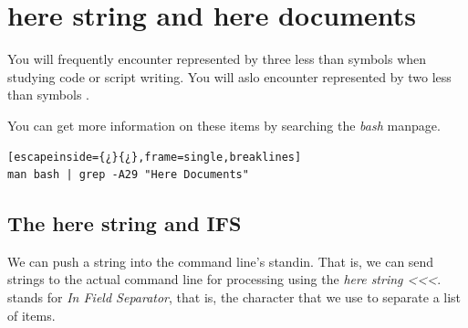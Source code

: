 \section{here string and here documents}

You will frequently encounter  represented by three less than symbols \tbi{<{}<{}<{}} when studying code or script writing. You will aslo encounter  represented by two less than symbols \tbi{<{}<{}}.

You can get more information on these items by searching the \emph{bash} manpage.

\begin{lstlisting}[escapeinside={¿}{¿},frame=single,breaklines]
man bash | grep -A29 "Here Documents"
\end{lstlisting}

\subsection{The here string and IFS}

We can push a string into the command line's standin. That is, we can send strings to the actual command line for processing using the \emph{here string <{}<{}<{}}.  stands for \emph{In Field Separator}, that is, the character that we use to separate a list of items.

